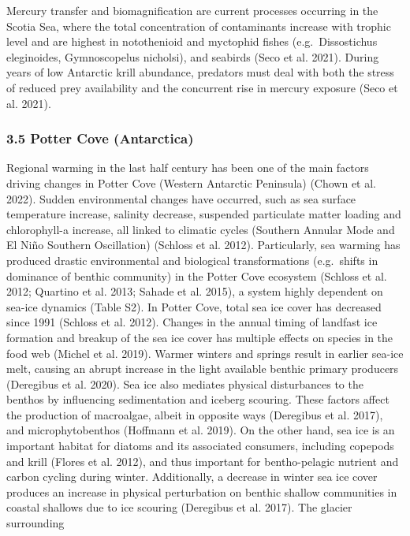 \documentclass[
]{article}
\begin{document}
Mercury transfer and biomagnification are current processes occurring in
the Scotia Sea, where the total concentration of contaminants increase
with trophic level and are highest in notothenioid and myctophid fishes
(e.g.~Dissostichus eleginoides, Gymnoscopelus nicholsi), and seabirds
(Seco et al. 2021). During years of low Antarctic krill abundance,
predators must deal with both the stress of reduced prey availability
and the concurrent rise in mercury exposure (Seco et al. 2021).

\subsubsection{3.5 Potter Cove
(Antarctica)}\label{potter-cove-antarctica}

Regional warming in the last half century has been one of the main
factors driving changes in Potter Cove (Western Antarctic Peninsula)
(Chown et al. 2022). Sudden environmental changes have occurred, such as
sea surface temperature increase, salinity decrease, suspended
particulate matter loading and chlorophyll-a increase, all linked to
climatic cycles (Southern Annular Mode and El Niño Southern Oscillation)
(Schloss et al. 2012). Particularly, sea warming has produced drastic
environmental and biological transformations (e.g.~shifts in dominance
of benthic community) in the Potter Cove ecosystem (Schloss et al. 2012;
Quartino et al. 2013; Sahade et al. 2015), a system highly dependent on
sea-ice dynamics (Table S2). In Potter Cove, total sea ice cover has
decreased since 1991 (Schloss et al. 2012). Changes in the annual timing
of landfast ice formation and breakup of the sea ice cover has multiple
effects on species in the food web (Michel et al. 2019). Warmer winters
and springs result in earlier sea-ice melt, causing an abrupt increase
in the light available benthic primary producers (Deregibus et al.
2020). Sea ice also mediates physical disturbances to the benthos by
influencing sedimentation and iceberg scouring. These factors affect the
production of macroalgae, albeit in opposite ways (Deregibus et al.
2017), and microphytobenthos (Hoffmann et al. 2019). On the other hand,
sea ice is an important habitat for diatoms and its associated
consumers, including copepods and krill (Flores et al. 2012), and thus
important for bentho-pelagic nutrient and carbon cycling during winter.
Additionally, a decrease in winter sea ice cover produces an increase in
physical perturbation on benthic shallow communities in coastal shallows
due to ice scouring (Deregibus et al. 2017). The glacier surrounding
\end{document}
